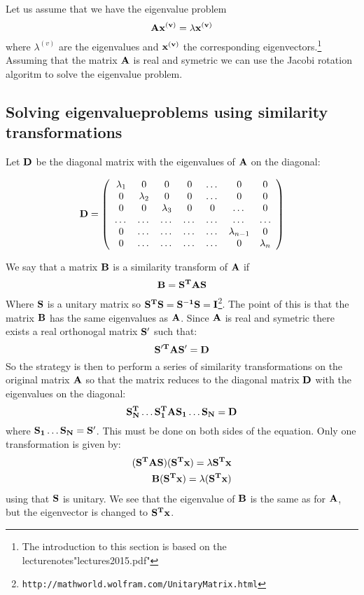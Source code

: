 \documentclass[11pt,a4wide]{article}
\begin{document}
Let us assume that we have the eigenvalue problem 
\[
\bf A \bf x^{(v)} = \lambda \bf x^{(v)}
\]
where $\lambda^{(v)}$ are the eigenvalues and $\bf x^{(v)}$ the corresponding eigenvectors.\footnote{The introduction to this section is based on the lecturenotes"lectures2015.pdf"} Assuming that the matrix $\bf A$ is real and symetric we can use the Jacobi rotation algoritm to solve the eigenvalue problem. 

\subsection{Solving eigenvalueproblems using similarity transformations}
Let $\bf D$ be the diagonal matrix with the eigenvalues of $\bf A$ on the diagonal:

\begin{equation}
    \bf D = \left( \begin{array}{ccccccc} \lambda_1 & 0 & 0   & 0    & \dots  &0     & 0 \\
                                0  & \lambda_2 & 0 & 0    & \dots  &0     &0 \\
                                0   & 0 & \lambda_3 & 0  &0       &\dots & 0\\
                                \dots  & \dots & \dots & \dots  &\dots      &\dots & \dots\\
                                0   & \dots & \dots & \dots  &\dots       &\lambda_{n-1} & 0\\
                                0   & \dots & \dots & \dots  &\dots       &0 & \lambda_n

             \end{array} \right) 
      \label{eq:sematrix}
\end{equation} 

We say that a matrix $\bf B$ is a similarity transform of $\bf A$ if 
\[
\bf B = \bf {S^T AS}
\]
Where $\bf S$ is a unitary matrix so $\bf{S^TS} = \bf{S^{-1}S} = \bf I$\footnote{\texttt{http://mathworld.wolfram.com/UnitaryMatrix.html}}. The point of this is that the matrix $\bf B$ has the same eigenvalues as $\bf A$. Since $\bf A$ is real and symetric there exists a real orthonogal matrix $\bf S'$ such that: 
\[
\bf {S'^T AS'} = \bf D
\]
So the strategy is then to perform a series of similarity transformations on the original matrix $\bf A$ so that the matrix reduces to the diagonal matrix $\bf D$ with the eigenvalues on the diagonal:
\[
\bf{S_N^T\dots S_1^TAS_1\dots S_N} = \bf D
\]
where $\bf{S_1\dots S_N} = \bf S'$. This must be done on both sides of the equation. Only one transformation is given by:
\begin{align*}
(\bf{S^TAS})(\bf{S^Tx}) = \lambda \bf{S^Tx} \\
\bf{B(S^Tx)} = \lambda\bf{(S^Tx)}
\end{align*}
using that $\bf S$ is unitary. We see that the eigenvalue of $\bf B$ is the same as for $\bf A$, but the eigenvector is changed to $\bf{S^Tx}$.
\end{document}
